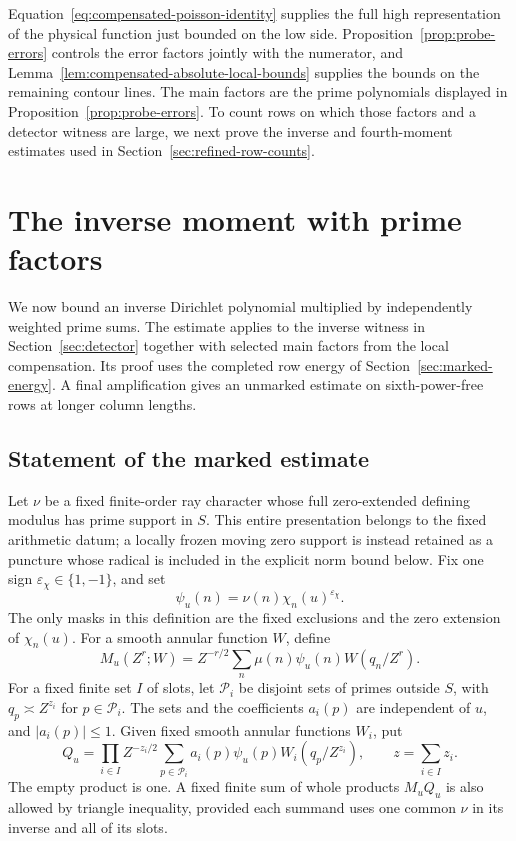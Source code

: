 \documentclass[11pt,a4paper]{article}
\numberwithin{equation}{section}
\numberwithin{figure}{section}
\theoremstyle{definition}
\theoremstyle{remark}
\begin{document}
Equation~\eqref{eq:compensated-poisson-identity} supplies the full high
representation of the physical function just bounded on the low side.
Proposition~\ref{prop:probe-errors} controls the error factors jointly with
the numerator, and Lemma~\ref{lem:compensated-absolute-local-bounds} supplies
the bounds on the remaining contour lines. The main factors are the prime
polynomials displayed in Proposition~\ref{prop:probe-errors}. To count rows
on which those factors and a detector witness are large, we next prove
the inverse and fourth-moment estimates used in
Section~\ref{sec:refined-row-counts}.

\section{The inverse moment with prime factors}\label{sec:inverse}

We now bound an inverse Dirichlet polynomial multiplied by independently
weighted prime sums. The estimate applies to the inverse witness in
Section~\ref{sec:detector} together with selected main factors from the
local compensation. Its proof uses the completed row energy of
Section~\ref{sec:marked-energy}. A final amplification gives an unmarked
estimate on sixth-power-free rows at longer column lengths.

\subsection{Statement of the marked estimate}

Let \(\nu\) be a fixed finite-order ray character whose full
zero-extended defining modulus has prime support in \(S\).  This entire
presentation belongs to the fixed arithmetic datum; a locally frozen
moving zero support is instead retained as a puncture whose radical is
included in the explicit norm bound below.
Fix one sign \(\varepsilon_\chi\in\{1,-1\}\), and set
\[
 \psi_u(n)=\nu(n)\chi_n(u)^{\varepsilon_\chi}.
\]
The only masks in this definition are the fixed exclusions and the zero
extension of \(\chi_n(u)\).
For a smooth annular function \(W\), define
\[
 M_u(Z^r;W)=Z^{-r/2}\sum_n\mu(n)\psi_u(n)W(q_n/Z^r).
\]
For a fixed finite set \(I\) of slots, let \(\mathcal P_i\) be disjoint
sets of primes outside \(S\), with \(q_p\asymp Z^{z_i}\) for
\(p\in\mathcal P_i\).  The sets and the coefficients \(a_i(p)\) are
independent of \(u\), and \(|a_i(p)|\le1\).  Given fixed smooth annular
functions \(W_i\), put
\[
 Q_u=\prod_{i\in I}Z^{-z_i/2}
       \sum_{p\in\mathcal P_i}a_i(p)\psi_u(p)W_i(q_p/Z^{z_i}),
 \qquad z=\sum_{i\in I}z_i.
\]
The empty product is one.
A fixed finite sum of whole products \(M_uQ_u\) is also allowed by
triangle inequality, provided each summand uses one common \(\nu\)
in its inverse and all of its slots.
\end{document}
